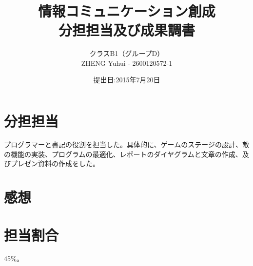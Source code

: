 \documentclass{jarticle}
\title{情報コミュニケーション創成\\分担担当及び成果調書}
\author{クラスB1（グループD）\\ZHENG Yuhui - 2600120572-1}
\date{提出日:2015年7月20日}
\begin{document}
\maketitle
	\section{分担担当}
	プログラマーと書記の役割を担当した。具体的に、ゲームのステージの設計、敵の機能の実装、プログラムの最適化、レポートのダイヤグラムと文章の作成、及びプレゼン資料の作成をした。
	\section{感想}
		
	\section{担当割合}
		45\%。
\end{document}
